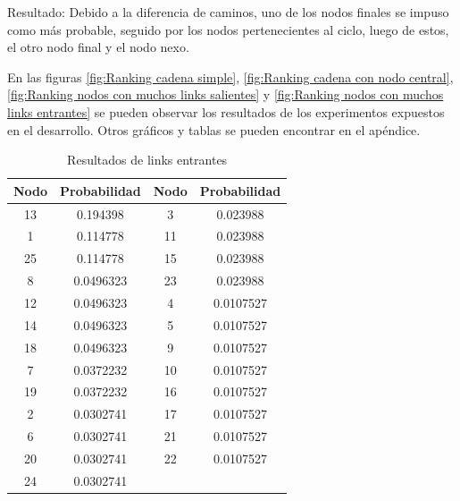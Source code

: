 Resultado: Debido a la diferencia de caminos, uno de los nodos finales se impuso como m\'as probable, seguido por los nodos pertenecientes al ciclo, luego de estos, el otro nodo final y el nodo nexo.


En las figuras \ref{fig:Ranking cadena simple}, \ref{fig:Ranking cadena con nodo central}, \ref{fig:Ranking nodos con muchos links salientes} y \ref{fig:Ranking nodos con muchos links entrantes} se pueden observar los resultados de los experimentos expuestos en el desarrollo.
Otros gráficos y tablas se pueden encontrar en el apéndice.

\begin{table}[H]
\centering
	\begin{tabular}{|c|c|c|c|}
		\hline
		Nodo & Probabilidad & Nodo & Probabilidad \\ \hline
		13   & 0.194398     & 3    & 0.023988     \\
		1    & 0.114778     & 11   & 0.023988     \\
		25   & 0.114778     & 15   & 0.023988     \\
		8    & 0.0496323    & 23   & 0.023988     \\
		12   & 0.0496323    & 4    & 0.0107527    \\
		14   & 0.0496323    & 5    & 0.0107527    \\
		18   & 0.0496323    & 9    & 0.0107527    \\
		7    & 0.0372232    & 10   & 0.0107527    \\
		19   & 0.0372232    & 16   & 0.0107527    \\
		2    & 0.0302741    & 17   & 0.0107527    \\
		6    & 0.0302741    & 21   & 0.0107527    \\
		20   & 0.0302741    & 22   & 0.0107527    \\
		24   & 0.0302741    & ~    & ~            \\ \hline
	\end{tabular}
\caption{Resultados de links entrantes}
\end{table}


